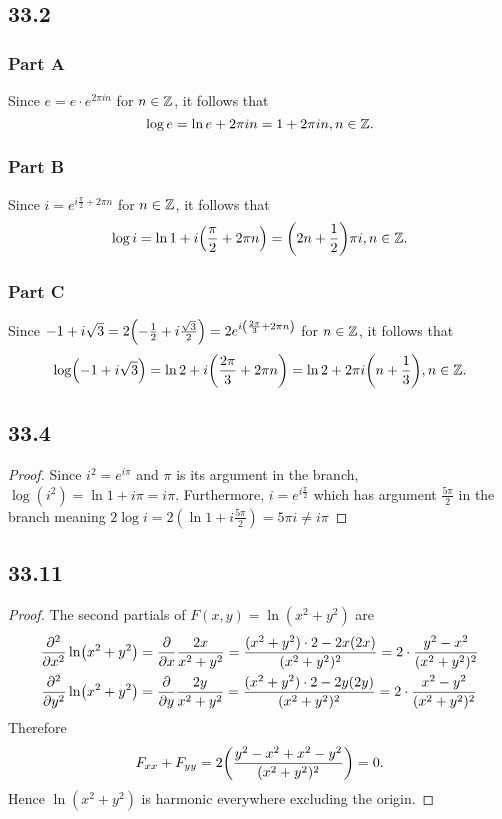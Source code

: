 \documentclass[12pt,titlepage]{extarticle}
\begin{document}

\subsection*{33.2}
\subsubsection*{Part A}
Since $e = e \cdot e^{2 \pi i n}$ for $n \in \mathbb{Z}$, it follows that
\[
    \log e = \ln e + 2 \pi i n = 1 + 2 \pi i n, n \in \mathbb{Z}
.\]

\subsubsection*{Part B}
Since $i = e^{i \frac{\pi}{2} + 2 \pi n}$ for $n \in \mathbb{Z}$, it follows that
\[
    \log i = \ln 1 + i \qty(\frac{\pi}{2} + 2 \pi n) = \qty(2n + \frac{1}{2}) \pi i, n \in \mathbb{Z}
.\]

\subsubsection*{Part C}
Since $-1 + i\sqrt{3} = 2 \qty(-\frac{1}{2} + i \frac{\sqrt{3}}{2}) = 2 e^{i \qty(\frac{2 \pi}{3} + 2 \pi n)}$ for $n \in \mathbb{Z}$, it follows that
\[
    \log (-1 + i \sqrt{3}) = \ln 2 + i \qty(\frac{2 \pi}{3} + 2 \pi n) = \ln 2 + 2 \pi i \qty(n + \frac{1}{3}), n \in \mathbb{Z}
.\]

\subsection*{33.4}
\begin{proof}
    Since $i^2 = e^{i \pi}$ and $\pi$ is its argument in the branch, $\log(i^2) = \ln 1 + i \pi = i \pi$. Furthermore, $i = e^{i \frac{\pi}{2}}$ which has argument $\frac{5 \pi}{2}$ in the branch meaning $2 \log i = 2(\ln 1 + i \frac{5 \pi}{2}) = 5 \pi i \neq i \pi$
\end{proof}

\subsection*{33.11}
\begin{proof}
    The second partials of $F(x,y) = \ln (x^2 + y^2)$ are
    \begin{align*}
        \pdv[2]{x} \ln(x^2 + y^2) &= \pdv{x} \frac{2x}{x^2 + y^2} = \frac{(x^2 + y^2) \cdot 2 - 2x (2x)}{(x^2 + y^2)^2} = 2\cdot \frac{y^2 - x^2}{(x^2 + y^2)^2} \\
        \pdv[2]{y} \ln(x^2 + y^2) &= \pdv{y} \frac{2y}{x^2 + y^2} = \frac{(x^2 + y^2)\cdot 2 - 2y (2y)}{(x^2 + y^2)^2} = 2 \cdot \frac{x^2 - y^2}{(x^2 + y^2)^2}
    \end{align*}
    Therefore
    \[
        F_{xx} + F_{yy} = 2 \qty(\frac{y^2 - x^2 + x^2 - y^2}{(x^2 + y^2)^2}) = 0
    .\]
    Hence $\ln(x^2 + y^2)$ is harmonic everywhere excluding the origin.
\end{proof}
\end{document}

